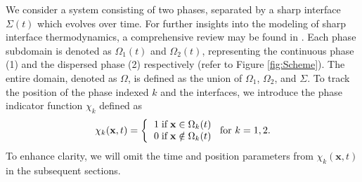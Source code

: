We consider a system consisting of two phases, separated by a sharp interface $\Sigma(t)$ which evolves over time. For further insights into the modeling of sharp interface thermodynamics, a comprehensive review may be found in \cite{bothe2022sharp}. %
Each phase subdomain is denoted as $\Omega_1(t)$ and $\Omega_2(t)$, representing the continuous phase (1) and the dispersed phase (2) respectively (refer to Figure \ref{fig:Scheme}).
The entire domain, denoted as $\Omega$, is defined as the union of $\Omega_1$, $\Omega_2$, and $\Sigma$.
To track the position of the phase indexed $k$ and the interfaces, we introduce the phase indicator function $\chi _k$ defined as
\begin{align}
    \chi_k(\textbf{x},t) =  \left\{
      \begin{tabular}{cc}
        $1 \;\text{if} \;\textbf{x} \in \Omega_k(t)$\\
        $0 \;\text{if} \;\textbf{x} \notin \Omega_k(t)$
      \end{tabular}
      \right.
      \text{for $k = 1,2$}.
      \label{eq:PIF}
\end{align}
To enhance clarity, we will omit the time and position parameters from $\chi_k(\textbf{x},t)$ %
 in the subsequent sections.


